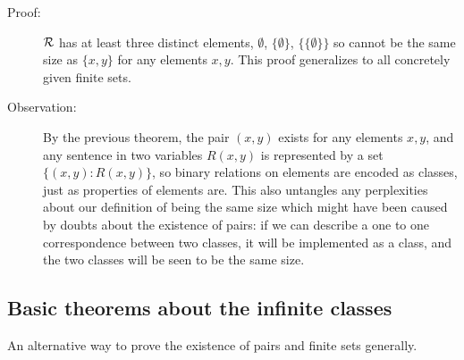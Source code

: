 \documentclass[12pt]{article}
\begin{document}
\begin{description}
\item[Proof:]  $\cal R$ has at least three distinct elements, $\emptyset$, $\{\emptyset\}$, $\{\{\emptyset\}\}$ so cannot be the same size as $\{x,y\}$ for any elements
$x,y$.  This proof generalizes to all concretely given finite sets.

\item[Observation:]  By the previous theorem, the pair $(x,y)$ exists for any elements $x,y$, and any sentence in two variables $R(x,y)$ is represented by a set
$\{(x,y):R(x,y)\}$, so binary relations on elements are encoded as classes, just as properties of elements are.  This also untangles any perplexities about our definition of being the same size which might have been caused by doubts about the existence of pairs:  if we can describe a one to one correspondence between two classes, it will be implemented as a class, and the two classes will be seen to be the same size.

\end{description}

\subsection{Basic theorems about the infinite classes}

An alternative way to prove the existence of pairs and finite sets generally.
\end{document}
